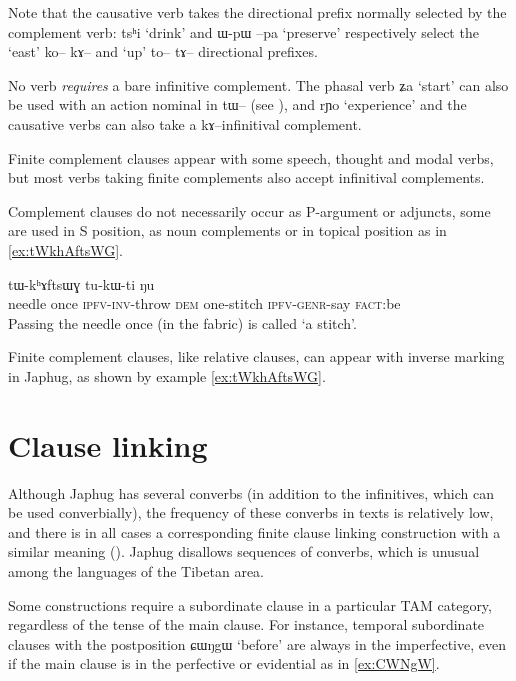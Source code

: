 \documentclass[oldfontcommands,oneside,a4paper,11pt]{article}
\newcommand{\ipa}[1]{{\phon #1}} %
\begin{document}
Note that the causative verb takes the directional prefix normally selected by the complement verb: \ipa{tsʰi} `drink' and \ipa{ɯ-pɯ} \ipa{--pa} `preserve'  respectively select the `east' \ipa{ko-- kɤ--} and `up' \ipa{to-- tɤ--} directional prefixes.

No verb \textit{requires} a bare infinitive complement. The phasal verb \ipa{ʑa} `start' can also be used with an action nominal in \ipa{tɯ--} (see \citealt[6-9]{jacques14antipassive}), and \ipa{rɲo} `experience' and the causative verbs can also take a \ipa{kɤ--}infinitival complement.

Finite complement clauses appear with some speech, thought and modal verbs, but most verbs taking finite complements also accept infinitival complements.

Complement clauses do not necessarily occur as P-argument or adjuncts, some are used in S position, as noun complements or in topical position as in \ref{ex:tWkhAftsWG}.


 \begin{exe}
\ex \label{ex:tWkhAftsWG}
\gll
[\ipa{taqaβ} 	\ipa{ci} 	\ipa{cʰɯ́-wɣ-lɤt}] 	\ipa{nɯ} 	\ipa{tɯ-kʰɤftsɯɣ} 	\ipa{tu-kɯ-ti} 	\ipa{ŋu} \\
needle once \textsc{ipfv-inv}-throw \textsc{dem} one-stitch \textsc{ipfv-genr}-say \textsc{fact}:be \\
\glt Passing the needle once (in the fabric) is called `a stitch'.
\end{exe}

Finite complement clauses, like relative clauses, can appear with inverse marking in Japhug, as shown by example \ref{ex:tWkhAftsWG}.

\section{Clause linking}
Although Japhug has several converbs (in addition to the infinitives, which can be used converbially), the frequency of these converbs in texts is relatively low, and there is in all cases a corresponding finite clause linking construction with a similar meaning (\citealt{jacques14linking}). Japhug disallows sequences of converbs, which is unusual among the languages of the Tibetan area. 


Some constructions require a subordinate clause in a particular TAM category, regardless of the tense of the main clause. For instance, temporal subordinate clauses with the postposition \ipa{ɕɯŋgɯ} `before' are always in the imperfective, even if the main clause is in the perfective or evidential as in \ref{ex:CWNgW}.
\end{document}
